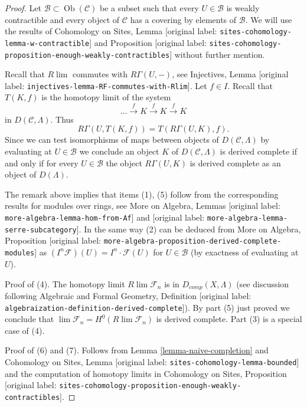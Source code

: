 \documentclass[10pt,a4paper]{article}
\theoremstyle{plain}
\theoremstyle{definition}
\theoremstyle{remark}
\numberwithin{equation}{subsection}
\def\lim{\mathop{\mathrm{lim}}\nolimits}
\def\Ob{\mathop{\mathrm{Ob}}\nolimits}
\begin{document}
\begin{proof}
Let $\mathcal{B} \subset \Ob(\mathcal{C})$ be a subset such that every
$U \in \mathcal{B}$ is weakly contractible and every object of $\mathcal{C}$
has a covering by elements of $\mathcal{B}$.
We will use the results of Cohomology on Sites,
Lemma [original label: \nolinkurl{sites-cohomology-lemma-w-contractible}] and
Proposition [original label: \nolinkurl{sites-cohomology-proposition-enough-weakly-contractibles}]
without further mention.

\medskip\noindent
Recall that $R\lim$ commutes with $R\Gamma(U, -)$,
see Injectives, Lemma [original label: \nolinkurl{injectives-lemma-RF-commutes-with-Rlim}].
Let $f \in I$. Recall that $T(K, f)$ is the homotopy limit
of the system
$$
\ldots \xrightarrow{f} K \xrightarrow{f} K \xrightarrow{f} K
$$
in $D(\mathcal{C}, \Lambda)$. Thus
$$
R\Gamma(U, T(K, f)) = T(R\Gamma(U, K), f).
$$
Since we can test isomorphisms of maps between objects of
$D(\mathcal{C}, \Lambda)$ by evaluating at $U \in \mathcal{B}$
we conclude an object $K$ of $D(\mathcal{C}, \Lambda)$
is derived complete if and only if for every $U \in \mathcal{B}$ the
object $R\Gamma(U, K)$ is derived complete as an object of $D(\Lambda)$.

\medskip\noindent
The remark above implies that items (1), (5) follow from the corresponding
results for modules over rings, see
More on Algebra, Lemmas [original label: \nolinkurl{more-algebra-lemma-hom-from-Af}] and
[original label: \nolinkurl{more-algebra-lemma-serre-subcategory}].
In the same way (2) can be deduced from
More on Algebra, Proposition
[original label: \nolinkurl{more-algebra-proposition-derived-complete-modules}]
as $(I^n\mathcal{F})(U) = I^n \cdot \mathcal{F}(U)$
for $U \in \mathcal{B}$ (by exactness of evaluating at $U$).

\medskip\noindent
Proof of (4). The homotopy limit $R\lim \mathcal{F}_n$ is in
$D_{comp}(X, \Lambda)$ (see discussion following
Algebraic and Formal Geometry, Definition
[original label: \nolinkurl{algebraization-definition-derived-complete}]).
By part (5) just proved we conclude that
$\lim \mathcal{F}_n = H^0(R\lim \mathcal{F}_n)$
is derived complete.
Part (3) is a special case of (4).

\medskip\noindent
Proof of (6) and (7). Follows from
Lemma \ref{lemma-naive-completion}
and
Cohomology on Sites, Lemma [original label: \nolinkurl{sites-cohomology-lemma-bounded}]
and the computation of homotopy limits in Cohomology on Sites,
Proposition [original label: \nolinkurl{sites-cohomology-proposition-enough-weakly-contractibles}].
\end{proof}
\end{document}
